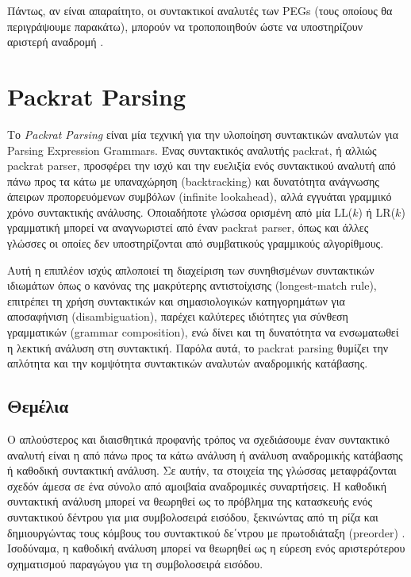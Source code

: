 \documentclass[diploma]{softlab-thesis}
\begin{document}
Πάντως, αν είναι απαραίτητο, οι συντακτικοί αναλυτές των PEGs (τους οποίους θα περιγράψουμε παρακάτω), μπορούν να τροποποιηθούν ώστε να υποστηρίζουν αριστερή αναδρομή \cite{Warth2008a}.

\chapter{ Packrat Parsing }

Το \textit{Packrat Parsing} \cite{Ford2004a} είναι μία τεχνική για την υλοποίηση συντακτικών αναλυτών για Parsing Expression Grammars.
Ένας συντακτικός αναλυτής packrat, ή αλλιώς packrat parser, προσφέρει την ισχύ και την ευελιξία ενός συντακτικού αναλυτή από πάνω προς τα κάτω με υπαναχώρηση (backtracking) και δυνατότητα ανάγνωσης άπειρων προπορευόμενων συμβόλων (infinite lookahead), αλλά εγγυάται γραμμικό χρόνο συντακτικής ανάλυσης.
Οποιαδήποτε γλώσσα ορισμένη από μία LL($k$) ή LR($k$) γραμματική μπορεί να αναγνωριστεί από έναν packrat parser, όπως και άλλες γλώσσες οι οποίες δεν υποστηρίζονται από συμβατικούς γραμμικούς αλγορίθμους.

Αυτή η επιπλέον ισχύς απλοποιεί τη διαχείριση των συνηθισμένων συντακτικών ιδιωμάτων όπως ο κανόνας της μακρύτερης αντιστοίχισης (longest-match rule), επιτρέπει τη χρήση συντακτικών και σημασιολογικών κατηγορημάτων για αποσαφήνιση (disambiguation), παρέχει καλύτερες ιδιότητες για σύνθεση γραμματικών (grammar composition), ενώ δίνει και τη δυνατότητα να ενσωματωθεί η λεκτική ανάλυση στη συντακτική.
Παρόλα αυτά, το packrat parsing θυμίζει την απλότητα και την κομψότητα συντακτικών αναλυτών αναδρομικής κατάβασης.

\section{Θεμέλια}

Ο απλούστερος και διαισθητικά προφανής τρόπος να σχεδιάσουμε έναν συντακτικό αναλυτή είναι η από πάνω προς τα κάτω ανάλυση ή ανάλυση αναδρομικής κατάβασης ή καθοδική συντακτική ανάλυση.
Σε αυτήν, τα στοιχεία της γλώσσας μεταφράζονται σχεδόν άμεσα σε ένα σύνολο από αμοιβαία αναδρομικές συναρτήσεις.
Η καθοδική συντακτική ανάλυση μπορεί να θεωρηθεί ως το πρόβλημα της κατασκευής ενός συντακτικού δέντρου για μια συμβολοσειρά εισόδου, ξεκινώντας από τη ρίζα και δημιουργώντας τους κόμβους του συντακτικού δε΄ντρου με πρωτοδιάταξη (preorder) \cite{Aho2007}. Ισοδύναμα, η καθοδική ανάλυση μπορεί να θεωρηθεί ως η εύρεση ενός αριστερότερου σχηματισμού παραγώγου για τη συμβολοσειρά εισόδου.
\end{document}
